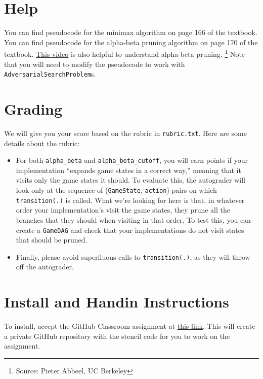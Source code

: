 \documentclass{article}
\begin{document}
\section{Help}
You can find pseudocode for the minimax algorithm on page 166 of the textbook.
You can find pseudocode for the alpha-beta pruning algorithm on page 170 of the textbook.
\href{https://www.youtube.com/watch?v=xBXHtz4Gbdo&ab_channel=JohnLevine}{This video} is also helpful to understand alpha-beta pruning.
\footnote{Source: Pieter Abbeel, UC Berkeley}
Note that you will need to modify the pseudocode to work with \verb|AdversarialSearchProblem|s.


\section{Grading}
We will give you your score based on the rubric in \verb|rubric.txt|.
Here are some details about the rubric:

\begin{itemize}
  \item For both \verb|alpha_beta| and \verb|alpha_beta_cutoff|, you will earn points if your implementation ``expands game states in a correct way,'' meaning that it visits only the game states it should.
  To evaluate this, the autograder will look only at the sequence of (\verb|GameState|, \verb|action|) pairs on which \verb|transition(.)| is called.
  What we're looking for here is that, in whatever order your implementation's visit the game states, they prune all the branches that they should when visiting in that order.
  To test this, you can create a \verb|GameDAG| and check that your implementations do not visit states that should be pruned.

  \item Finally, please avoid superfluous calls to \verb|transition(.)|, as they will throw off the autograder.
\end{itemize}


\section{Install and Handin Instructions}
To install, accept the GitHub Classroom assignment at \href{https://classroom.github.com/a/InOt0_KY}{this link}. This will
create a private GitHub repository with the stencil code for you to work on the
assignment.
\end{document}

